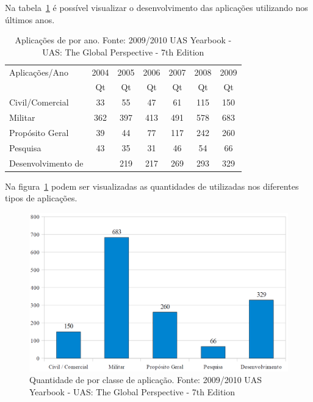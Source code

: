 Na tabela~\ref{tbl:vants_por_ano} é possível visualizar o desenvolvimento das aplicações utilizando \vants nos últimos anos.


\begin{table}[h!]
\centering
	\begin{tabular}{| l | c | c | c | c | c | c |}
		\hline
		Aplicações/Ano & 2004 & 2005 & 2006 & 2007 & 2008 & 2009 \\
		\cline{2-7}
		 & Qt & Qt & Qt & Qt & Qt & Qt  \\
		\hline
		Civil/Comercial  & 33 &  55  & 47  & 61  & 115  & 150 \\
		Militar  & 362  & 397  & 413  & 491  & 578  & 683 \\
		Propósito Geral &  39  & 44  & 77  & 117  & 242  & 260 \\
		Pesquisa  & 43  & 35  & 31  & 46  & 54  & 66 \\
		Desenvolvimento de \vants &   & 219  & 217  & 269  & 293  & 329 \\
		\hline
	\end{tabular}

	\caption{Aplicações de \vants por ano. Fonte: 2009/2010 UAS Yearbook - UAS: The Global Perspective - 7th Edition}
	\label{tbl:vants_por_ano}
\end{table}

Na figura~\ref{fig:qt_uav_app} podem ser visualizadas as quantidades de \vants utilizadas nos diferentes tipos de aplicações.

\begin{figure}[h!]
\centering
\includegraphics[width=14cm]{pictures/qt_uavs_app.png}
\caption{Quantidade de \vants por classe de aplicação. Fonte: 2009/2010 UAS Yearbook - UAS: The Global Perspective - 7th Edition}
 \label{fig:qt_uav_app}
\end{figure}

